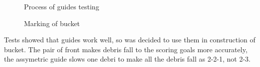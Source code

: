 \begin{enumerate}
\begin{figure}[H]
\begin{minipage}[h]{0.31\linewidth}
  		\caption{Process of guides testing}
  	\end{minipage}
  	\hfill
  	\begin{minipage}[h]{0.31\linewidth}
  		\caption{Marking of bucket}
  	\end{minipage}
  \end{figure}
  Tests showed that guides work well, so was decided to use them in construction of bucket. The pair of front makes debris fall to the scoring goals more accurately, the assymetric guide slows one debri to make all the debris fall as 2-2-1, not 2-3.
 

\end{enumerate}
